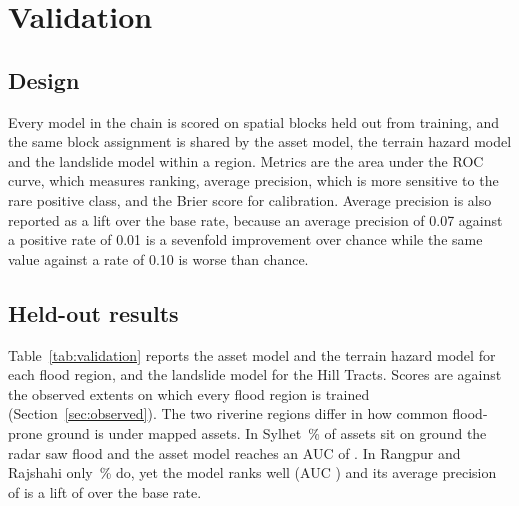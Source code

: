 \documentclass[10pt,a4paper,twocolumn]{article}
\begin{document}
\section{Validation}
\label{sec:validation}

\subsection{Design}

Every model in the chain is scored on spatial blocks held out from training, and the same block assignment is shared by the asset model, the terrain hazard model and the landslide model within a region. Metrics are the area under the ROC curve, which measures ranking, average precision, which is more sensitive to the rare positive class, and the Brier score for calibration. Average precision is also reported as a lift over the base rate, because an average precision of 0.07 against a positive rate of 0.01 is a sevenfold improvement over chance while the same value against a rate of 0.10 is worse than chance.

\subsection{Held-out results}

Table~\ref{tab:validation} reports the asset model and the terrain hazard model for each flood region, and the landslide model for the Hill Tracts. Scores are against the observed extents on which every flood region is trained (Section~\ref{sec:observed}). The two riverine regions differ in how common flood-prone ground is under mapped assets. In Sylhet \SylhetLabelRate{}\,\% of assets sit on ground the radar saw flood and the asset model reaches an AUC of \SylhetValAUC{}. In Rangpur and Rajshahi only \RRLabelRate{}\,\% do, yet the model ranks well (AUC \RRValAUC{}) and its average precision of \RRValAP{} is a lift of \RRValAPLift{} over the base rate.
\end{document}
